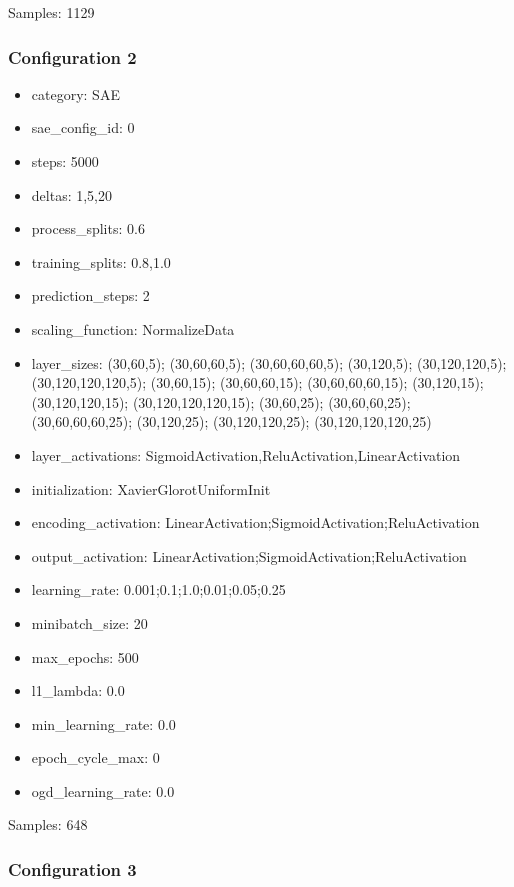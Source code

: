 \documentclass[a4paper,11pt,oneside]{article}
\theoremstyle{plain}
\theoremstyle{definition}
\begin{document}
	Samples: 1129
	
	\subsubsection{Configuration 2}\label{config2}
	\begin{itemize}
		\item category: SAE
		\item sae\_config\_id: 0
		\item steps: 5000
		\item deltas: 1,5,20
		\item process\_splits: 0.6
		\item training\_splits: 0.8,1.0
		\item prediction\_steps: 2
		\item scaling\_function: NormalizeData
		\item layer\_sizes: (30,60,5); (30,60,60,5); (30,60,60,60,5); (30,120,5); (30,120,120,5); (30,120,120,120,5); (30,60,15); (30,60,60,15); (30,60,60,60,15); (30,120,15); (30,120,120,15); (30,120,120,120,15); (30,60,25); (30,60,60,25); (30,60,60,60,25); (30,120,25); (30,120,120,25); (30,120,120,120,25)
		\item layer\_activations: SigmoidActivation,ReluActivation,LinearActivation
		\item initialization: XavierGlorotUniformInit
		\item encoding\_activation: LinearActivation;SigmoidActivation;ReluActivation
		\item output\_activation: LinearActivation;SigmoidActivation;ReluActivation
		\item learning\_rate: 0.001;0.1;1.0;0.01;0.05;0.25
		\item minibatch\_size: 20
		\item max\_epochs: 500
		\item l1\_lambda: 0.0
		\item min\_learning\_rate: 0.0
		\item epoch\_cycle\_max: 0
		\item ogd\_learning\_rate: 0.0
	\end{itemize}
	
	Samples: 648
	
	\subsubsection{Configuration 3}\label{config3}
	
\end{document}

